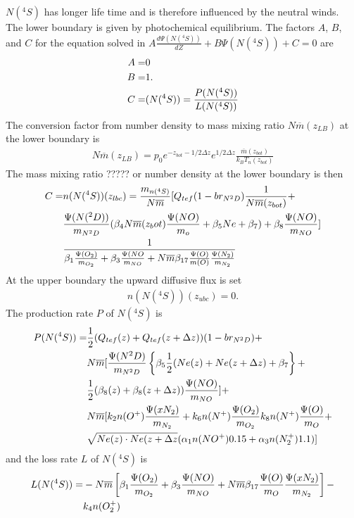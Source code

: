 %
%
$N(^4S)$ has longer life time and is therefore influenced by the
neutral winds. \\
The lower boundary is given by photochemical equilibrium. The
factors $A$, $B$, and $C$ for the equation solved in  $A\frac{d \Psi(N(^4S))}{dZ} + B \Psi(N(^4S)) + C = 0$ are
%
\begin{align}
  A =& 0 \notag \\
  B =& 1. \notag \\
  C =& (N(^4S))= \frac{P(N(^4S))}{L(N(^4S))}
\end{align}
%
The conversion factor from number density to mass mixing ratio $N
\overline{m}(z_{LB})$ at the lower boundary is
%
\begin{align}
 N \overline{m}(z_{LB})= p_0 e^{-z_{bot}-1/2\Delta z} e^{1/2\Delta
 z}\frac{\overline{m}(z_{bot})}{k_B T_n(z_{bot})}
\end{align}
%
The mass mixing ratio ????? or number density at the lower boundary
is then
%
\begin{align}
 C = & n(N(^4S))(z_{lbc})= \frac{m_{n(^4S)}}{N\overline{m}}[ Q_{tef}(1-br_{N^2D})
  \frac{1}{N\overline{m}(z_{bot})} + \notag \\
  & \frac{\Psi(N(^2D))}{m_{N^2D}}(
  \beta_4 N \overline{m}(z_bot)\frac{\Psi(NO)}{m_o}+ \beta_5 Ne + \beta_7)
  + \beta_8\frac{\Psi(NO)}{m_{NO}}]\notag \\
   & \frac{1}{\beta_1
  \frac{\Psi(O_2)}{m_{O_2}}+\beta_3\frac{\Psi(NO}{m_{NO}}+N\overline{m} \beta_{17}
  \frac{\Psi(O)}{m(O)}\frac{\Psi(N_2)}{m_{N_2}}}
\end{align}
%
At the upper boundary the upward diffusive flux  is set
%
\begin{align}
 n(N(^4S))(z_{ubc})= 0.
\end{align}
%
The production rate $P$ of $N(^4S)$ is
%
\begin{align}
P(N(^4S))=& \frac{1}{2} (Q_{tef}(z)+Q_{tef}(z+\Delta
z))(1-br_{N^2D})
+ \notag \\
& N\overline{m} [\frac{\Psi(N^2D)}{m_{N^2D}}\left\{ \beta_5
 \frac{1}{2}(Ne(z) + Ne(z+\Delta z)+\beta_7\right\} + \notag \\
&  \frac{1}{2}(\beta_8(z) + \beta_8(z+\Delta
 z))\frac{\Psi(NO)}{m_{NO}}]+  \notag \\
& N\overline{m} [ k_2 n(O^+)\frac{\Psi(xN_2)}{m_{N_2}}+ k_6
 n(N^+)\frac{\Psi(O_2)}{m_{O_2}} k_8
 n(N^+)\frac{\Psi(O)}{m_{O}}+ \notag \\
& \sqrt{Ne(z) \cdot Ne(z+\Delta z}
 (\alpha_1 n(NO^+)0.15 + \alpha_3 n(N_2^+)1.1)]
\end{align}
%
and the loss rate $L$ of $N(^4S)$ is
%
\begin{align}
  L(N(^4S)) = & -N\overline{m} \left[ \beta_1 \frac{\Psi(O_2)}{m_{O_2}} +
   \beta_3 \frac{\Psi(NO)}{m_{NO}} + N \overline{m} \beta_{17} \frac{\Psi(O)}{m_{O}}
    \frac{\Psi(xN_2)}{m_{N_2}} \right] - \notag \\
    &  k_4 n(O_2^+)
\end{align}
%
%
%
